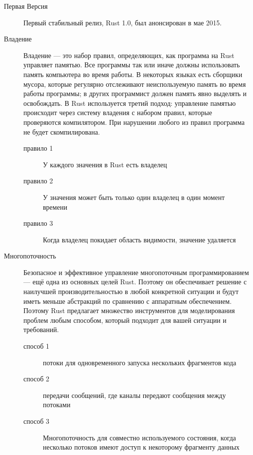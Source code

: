 \documentclass[a4paper,12pt]{article}
\begin{document}
\begin{description}
  \item[Первая Версия] Первый стабильный релиз, Rust 1.0, был анонсирован в мае 2015.
  \item[Владение] Владение — это набор правил, определяющих,
   как программа на Rust управляет памятью. Все программы так 
   или иначе должны использовать память компьютера во время работы.
   В некоторых языках есть сборщики мусора, которые регулярно
   отслеживают неиспользуемую память во время работы программы;
   в других программист должен память явно выделять и освобождать.
   В Rust используется третий подход: управление памятью происходит
   через систему владения с набором правил, которые проверяются
   компилятором. При нарушении любого из правил программа не будет
   скомпилирована.
   \begin{description}
    \item[правило 1] У каждого значения в Rust есть владелец
    \item[правило 2] У значения может быть только один владелец в один момент времени
    \item[правило 3] Когда владелец покидает область видимости, значение удаляется 
   \end{description}
  
  \item[Многопоточность] Безопасное и эффективное управление многопоточным
   программированием — ещё одна из основных целей Rust. Поэтому он обеспечивает
    решение с наилучшей производительностью в любой конкретной ситуации и будут
     иметь меньше абстракций по сравнению с аппаратным обеспечением. Поэтому
      Rust предлагает множество инструментов для моделирования проблем любым
       способом, который подходит для вашей ситуации и требований.
    \begin{description}
    \item[способ 1] потоки для одновременного запуска нескольких фрагментов кода
    \item[способ 2] передачи сообщений, где каналы передают сообщения между потоками
    \item[способ 3] Многопоточность для совместно используемого состояния,
     когда несколько потоков имеют доступ к некоторому фрагменту данных
    \end{description}


\end{description}
\end{document}
